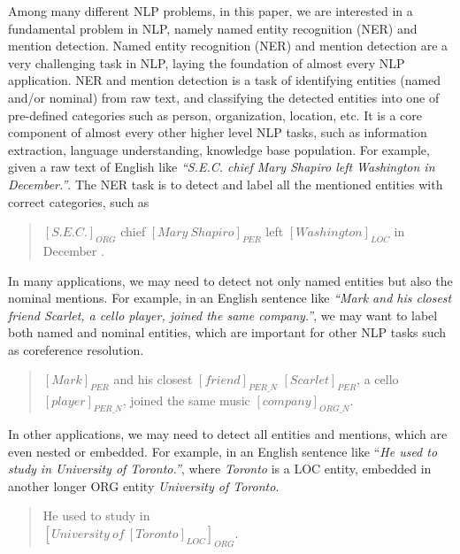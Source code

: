 \documentclass[11pt,a4paper]{article}
\begin{document}
Among many different NLP problems, in this paper, we are interested in a fundamental problem in NLP, namely named entity recognition (NER) and mention detection. Named entity recognition (NER) and mention detection are a very  challenging task in NLP, laying the foundation of almost every NLP application.
NER and mention detection is a task of identifying entities (named and/or nominal) from raw text, and classifying  the detected entities into one of pre-defined categories such as person, organization, location, etc.  
It is a core component of almost every other higher level NLP tasks, such as information extraction, language understanding, knowledge base population.  For example, given a raw text of English like {\it ``S.E.C. chief Mary Shapiro left Washington in December.''}. The NER task is to detect and label all the mentioned entities with correct  categories, such as
\begin{quote}
	\label{emp:3types}
	\small
	${[S.E.C.]}_{ORG}$ chief ${[Mary\ Shapiro]}_{PER}$ left ${[Washington]}_{LOC}$ in December .
\end{quote}

In many applications, we may need to detect not only named entities but also the nominal mentions. For example, in an English sentence like {\it ``Mark and his closest friend Scarlet, a cello player, joined the same company.''}, we may want to label both named and nominal entities, which are important for other NLP tasks such as coreference resolution. 

\begin{quote}
	\label{emp:3types}
	\small
	$[Mark]_{PER}$ and his closest $[friend]_{PER\_N}$ $[Scarlet]_{PER}$, a cello $[player]_{PER\_N}$, joined the same music $[company]_{ORG\_N}$.
\end{quote}

In other applications, we may need to detect all entities and mentions, which are even nested or embedded. For example, in an English sentence like {``\it He used to study in University of Toronto.''}, where {\it Toronto} is a LOC entity, embedded in another longer ORG entity {\it University of Toronto}.

\begin{quote}
	\label{emp:nested-ex}
	\small
	He used to study in \\  ${[University\ of\ {[Toronto]}_{LOC}]}_{ORG}$.
\end{quote}
\end{document}

